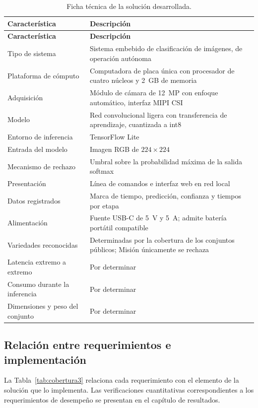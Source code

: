 \begin{longtable}{L{4.6cm}L{9.4cm}}
\caption{Ficha técnica de la solución desarrollada.}
\label{tab:ficha} \\
\toprule
\textbf{Característica} & \textbf{Descripción} \\
\midrule
\endfirsthead
\toprule
\textbf{Característica} & \textbf{Descripción} \\
\midrule
\endhead
Tipo de sistema & Sistema embebido de clasificación de imágenes, de operación autónoma \\
Plataforma de cómputo & Computadora de placa única con procesador de cuatro núcleos y 2~GB de memoria \citep{rpi5specs} \\
Adquisición & Módulo de cámara de 12~MP con enfoque automático, interfaz MIPI CSI \citep{rpicam3} \\
Modelo & Red convolucional ligera con transferencia de aprendizaje, cuantizada a int8 \\
Entorno de inferencia & TensorFlow Lite \\
Entrada del modelo & Imagen RGB de $224\times224$ \\
Mecanismo de rechazo & Umbral sobre la probabilidad máxima de la salida softmax \\
Presentación & Línea de comandos e interfaz web en red local \\
Datos registrados & Marca de tiempo, predicción, confianza y tiempos por etapa \\
Alimentación & Fuente USB-C de 5~V y 5~A; admite batería portátil compatible \\
Variedades reconocidas & Determinadas por la cobertura de los conjuntos públicos; Misión únicamente se rechaza \\
Latencia extremo a extremo & Por determinar \\
Consumo durante la inferencia & Por determinar \\
Dimensiones y peso del conjunto & Por determinar \\
\bottomrule
\end{longtable}

\subsection{Relación entre requerimientos e implementación}

La Tabla~\ref{tab:cobertura3} relaciona cada requerimiento con el elemento
de la solución que lo implementa. Las verificaciones cuantitativas
correspondientes a los requerimientos de desempeño se presentan en el
capítulo de resultados.

